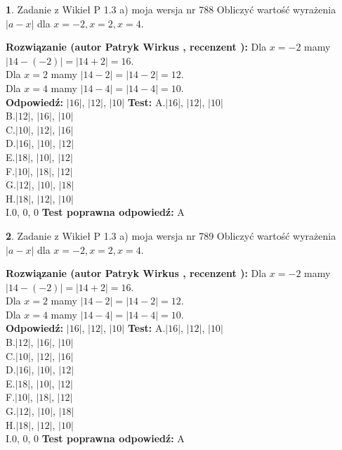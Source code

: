 \documentclass[12pt, a4paper]{article}
\theoremstyle{definition} %
\newtheorem{zad}{}
\newcommand{\zadStart}[1]{\begin{zad}#1\newline}
\newcommand{\zadStop}{\end{zad}}
\newcommand{\rozwStart}[2]{\noindent \textbf{Rozwiązanie (autor #1 , recenzent #2): }\newline}
\newcommand{\rozwStop}{\newline}
\newcommand{\odpStart}{\noindent \textbf{Odpowiedź:}\newline}
\newcommand{\odpStop}{\newline}
\newcommand{\testStart}{\noindent \textbf{Test:}\newline}
\newcommand{\testStop}{\newline}
\newcommand{\kluczStart}{\noindent \textbf{Test poprawna odpowiedź:}\newline}
\newcommand{\kluczStop}{\newline}
\begin{document}
\zadStart{Zadanie z Wikieł P 1.3 a) moja wersja nr 788}
Obliczyć wartość wyrażenia $|a - x|$ dla $x=-2,x=2,x=4$.
\zadStop
\rozwStart{Patryk Wirkus}{}
Dla $x = -2$ mamy $|14 - (-2)| = |14 + 2| = 16$.\\
Dla $x = 2$ mamy $|14 - 2| = |14 - 2| = 12$.\\
Dla $x = 4$ mamy $|14 - 4| = |14 - 4| = 10$.\\
\rozwStop
\odpStart
$|16|$, $|12|$, $|10|$
\odpStop
\testStart
A.$|16|$, $|12|$, $|10|$\\
B.$|12|$, $|16|$, $|10|$\\
C.$|10|$, $|12|$, $|16|$\\
D.$|16|$, $|10|$, $|12|$\\
E.$|18|$, $|10|$, $|12|$\\
F.$|10|$, $|18|$, $|12|$\\
G.$|12|$, $|10|$, $|18|$\\
H.$|18|$, $|12|$, $|10|$\\
I.$0$, $0$, $0$
\testStop
\kluczStart
A
\kluczStop



\zadStart{Zadanie z Wikieł P 1.3 a) moja wersja nr 789}
Obliczyć wartość wyrażenia $|a - x|$ dla $x=-2,x=2,x=4$.
\zadStop
\rozwStart{Patryk Wirkus}{}
Dla $x = -2$ mamy $|14 - (-2)| = |14 + 2| = 16$.\\
Dla $x = 2$ mamy $|14 - 2| = |14 - 2| = 12$.\\
Dla $x = 4$ mamy $|14 - 4| = |14 - 4| = 10$.\\
\rozwStop
\odpStart
$|16|$, $|12|$, $|10|$
\odpStop
\testStart
A.$|16|$, $|12|$, $|10|$\\
B.$|12|$, $|16|$, $|10|$\\
C.$|10|$, $|12|$, $|16|$\\
D.$|16|$, $|10|$, $|12|$\\
E.$|18|$, $|10|$, $|12|$\\
F.$|10|$, $|18|$, $|12|$\\
G.$|12|$, $|10|$, $|18|$\\
H.$|18|$, $|12|$, $|10|$\\
I.$0$, $0$, $0$
\testStop
\kluczStart
A
\kluczStop
\end{document}
